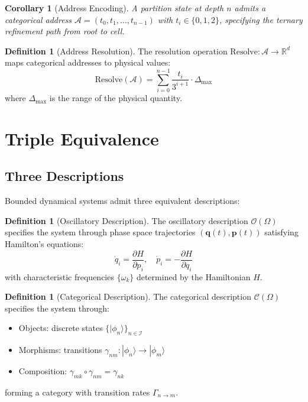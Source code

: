 \documentclass[10pt,twocolumn]{article}
\theoremstyle{plain}
\newtheorem{corollary}[theorem]{Corollary}
\theoremstyle{definition}
\newtheorem{definition}[theorem]{Definition}
\theoremstyle{remark}
\newcommand{\R}{\mathbb{R}}
\newcommand{\Ocat}{\mathcal{O}}
\newcommand{\Ccat}{\mathcal{C}}
\begin{document}
\begin{corollary}[Address Encoding]
\label{cor:address}
A partition state at depth $n$ admits a categorical address $\mathcal{A} = (t_0, t_1, \ldots, t_{n-1})$ with $t_i \in \{0, 1, 2\}$, specifying the ternary refinement path from root to cell.
\end{corollary}

\begin{definition}[Address Resolution]
\label{def:resolve}
The resolution operation $\mathrm{Resolve}: \mathcal{A} \to \R^d$ maps categorical addresses to physical values:
\begin{equation}
\mathrm{Resolve}(\mathcal{A}) = \sum_{i=0}^{n-1} \frac{t_i}{3^{i+1}} \cdot \Delta_{\max}
\label{eq:resolve}
\end{equation}
where $\Delta_{\max}$ is the range of the physical quantity.
\end{definition}

\section{Triple Equivalence}
\label{sec:triple}

\subsection{Three Descriptions}

Bounded dynamical systems admit three equivalent descriptions:

\begin{definition}[Oscillatory Description]
\label{def:oscillatory}
The oscillatory description $\Ocat(\Omega)$ specifies the system through phase space trajectories $(\mathbf{q}(t), \mathbf{p}(t))$ satisfying Hamilton's equations:
\begin{equation}
\dot{q}_i = \frac{\partial H}{\partial p_i}, \quad \dot{p}_i = -\frac{\partial H}{\partial q_i}
\end{equation}
with characteristic frequencies $\{\omega_k\}$ determined by the Hamiltonian $H$.
\end{definition}

\begin{definition}[Categorical Description]
\label{def:categorical}
The categorical description $\Ccat(\Omega)$ specifies the system through:
\begin{itemize}
\item Objects: discrete states $\{|\phi_n\rangle\}_{n \in \mathcal{I}}$
\item Morphisms: transitions $\gamma_{nm}: |\phi_n\rangle \to |\phi_m\rangle$
\item Composition: $\gamma_{mk} \circ \gamma_{nm} = \gamma_{nk}$
\end{itemize}
forming a category with transition rates $\Gamma_{n \to m}$.
\end{definition}
\end{document}
